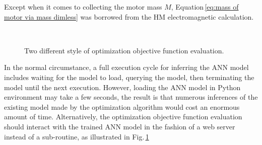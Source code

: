             
            Except when it comes to collecting the motor mass $M$, Equation\,\ref{eq:mass of motor via mass dimless} was borrowed from the \acs{HM} electromagnetic calculation. 
            
            
            \begin{figure}[!ht]
                \par\bigskip
                \centering
                \,\,\,\,\,\,
                \caption{
                    Two different style of optimization objective function evaluation.
                }\label{fig:chapter/rsm/PMLSM/inference options}
            \end{figure}
            
            
            In the normal circumstance, a full execution cycle for inferring the \acs{ANN} model includes waiting for the model to load, querying the model, then terminating the model until the next execution. However, loading the \acs{ANN} model in Python environment may take a few seconds, the result is that numerous inferences of the existing model made by the optimization algorithm would cost an enormous amount of time. Alternatively, the optimization objective function evaluation should interact with the trained \acs{ANN} model in the fashion of a web server instead of a sub-routine, as illustrated in Fig.\,\ref{fig:chapter/rsm/PMLSM/inference options}


